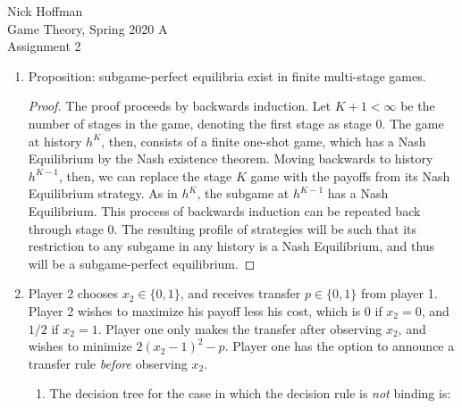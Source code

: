 \documentclass[11pt]{article}
\begin{document}
\begin{flushleft}
	Nick Hoffman \\
	Game Theory, Spring 2020 A \\
	Assignment 2 \\
\end{flushleft}

\begin{enumerate}
	\item Proposition: subgame-perfect equilibria exist in finite multi-stage games.
	\begin{proof}
		The proof proceeds by backwards induction. Let $ K + 1 < \infty $ be the number of stages in the game, denoting the first stage as stage 0. The game at history $ h^K $, then, consists of a finite one-shot game, which has a Nash Equilibrium by the Nash existence theorem. Moving backwards to history $ h^{K - 1} $, then, we can replace the stage $ K $ game with the payoffs from its Nash Equilibrium strategy. As in $ h^K $, the subgame at $ h^{K - 1} $ has a Nash Equilibrium. This process of backwards induction can be repeated back through stage 0. The resulting profile of strategies will be such that its restriction to any subgame in any history is a Nash Equilibrium, and thus will be a subgame-perfect equilibrium. 
	\end{proof}

	\item Player 2 chooses $ x_2 \in \{0,1\} $, and receives transfer $ p\in \{0,1\} $ from player 1. Player 2 wishes to maximize his payoff less his cost, which is 0 if $ x_2 = 0 $, and $ 1/2 $ if $ x_2 = 1 $. Player one only makes the transfer after observing $ x_2 $, and wishes to minimize $ 2(x_2 - 1)^2 - p $. Player one has the option to announce a transfer rule \emph{before} observing $ x_2 $. 
	\begin{enumerate}
		\item The decision tree for the case in which the decision rule is \emph{not} binding is:
		
		\begin{figure}[h]
			\centering
			\begin{tikzpicture}
			

\end{tikzpicture}
\end{figure}
\end{enumerate}
\end{enumerate}
\end{document}
